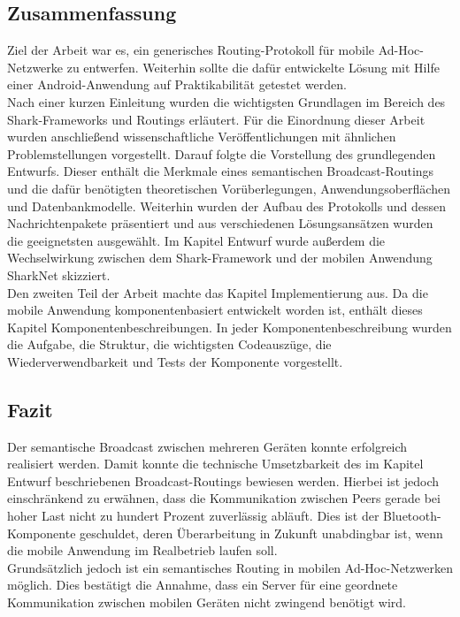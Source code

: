 \subsection{Zusammenfassung}
Ziel der Arbeit war es, ein generisches Routing-Protokoll für mobile Ad-Hoc-Netzwerke zu entwerfen. Weiterhin sollte die dafür entwickelte Lösung mit Hilfe einer Android-Anwendung auf Praktikabilität getestet werden. 
\\Nach einer kurzen Einleitung wurden die wichtigsten Grundlagen im Bereich des Shark-Frameworks und Routings erläutert. Für die Einordnung dieser Arbeit wurden anschließend wissenschaftliche Veröffentlichungen mit ähnlichen Problemstellungen vorgestellt. Darauf folgte die Vorstellung des grundlegenden Entwurfs. Dieser enthält die Merkmale eines semantischen Broadcast-Routings und die dafür benötigten theoretischen Vorüberlegungen, Anwendungsoberflächen und Datenbankmodelle. Weiterhin wurden der Aufbau des Protokolls und dessen Nachrichtenpakete präsentiert und aus verschiedenen Lösungsansätzen wurden die geeignetsten ausgewählt. Im Kapitel Entwurf wurde außerdem die Wechselwirkung zwischen dem Shark-Framework und der mobilen Anwendung SharkNet skizziert. 
\\Den zweiten Teil der Arbeit machte das Kapitel Implementierung aus. Da die mobile Anwendung komponentenbasiert entwickelt worden ist, enthält dieses Kapitel Komponentenbeschreibungen. In jeder Komponentenbeschreibung wurden die Aufgabe, die Struktur, die wichtigsten Codeauszüge, die Wiederverwendbarkeit und Tests der Komponente vorgestellt. 
\subsection{Fazit}
Der semantische Broadcast zwischen mehreren Geräten konnte erfolgreich realisiert werden. Damit konnte die technische Umsetzbarkeit des im Kapitel Entwurf beschriebenen Broadcast-Routings bewiesen werden. Hierbei ist jedoch einschränkend zu erwähnen, dass die Kommunikation zwischen Peers gerade bei hoher Last nicht zu hundert Prozent zuverlässig abläuft. Dies ist der Bluetooth-Komponente geschuldet, deren Überarbeitung in Zukunft unabdingbar ist, wenn die mobile Anwendung im Realbetrieb laufen soll. 
\\Grundsätzlich jedoch ist ein semantisches Routing in mobilen Ad-Hoc-Netzwerken möglich. Dies bestätigt die Annahme, dass ein Server für eine geordnete Kommunikation zwischen mobilen Geräten nicht zwingend benötigt wird.
\newpage
